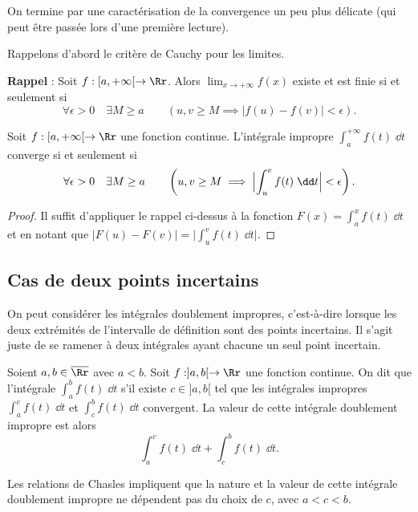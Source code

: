 \documentclass[class=report,crop=false]{standalone}
\begin{document}
On termine par une caractérisation de la convergence un peu plus délicate
(qui peut être passée lors d'une première lecture).


Rappelons d'abord le critère de Cauchy pour les limites.

\textbf{Rappel} : 
Soit $f : [a,+\infty[ \to \Rr$. 
Alors $\lim_{x\to +\infty} f(x)$ existe et est finie  si et seulement si 
$$\forall \epsilon>0\quad\exists M \ge a \qquad 
\left( u,v \ge M \implies \big|f(u)-f(v)\big|<\epsilon\right).$$

 
\begin{theoreme}
\label{th:intimpcauchy}
Soit $f : [a,+\infty[ \to \Rr$ une fonction continue.
L'intégrale impropre $\int_a^{+\infty} f(t) \; \dd t$ converge
si et seulement si
$$\forall \epsilon>0  \quad \exists  M \ge a \qquad
\left( u,v \ge M \implies \Bigl|\int_u^v f(t) \;\dd t\Bigr|<\epsilon\right).$$
\end{theoreme}

\begin{proof}
Il suffit d'appliquer le rappel ci-dessus à la fonction $F(x)=\int_a^x f(t) \; \dd t$ 
et en notant que $\big|F(u)-F(v)\big|=\big|\int_u^vf(t)\; \dd t\big|$.
\end{proof}

\subsection{Cas de deux points incertains}

On peut considérer les intégrales doublement impropres, c'est-à-dire lorsque les 
deux extrémités de l'intervalle de définition sont des points incertains. Il s'agit juste de se ramener à deux 
intégrales ayant chacune un seul point incertain.

\begin{definition}
Soient $a,b\in \overline{\Rr}$ avec $a<b$. 
Soit $f : ]a,b[ \to \Rr$ une fonction continue.
On dit que l'intégrale $\int_a^b f(t)\;\dd t$  s'il existe
$c \in ]a,b[$ tel que les  intégrales
impropres $\int_a^c f(t)\;\dd t$ et $\int_c^b f(t)\;\dd t$ convergent.
La valeur de cette intégrale doublement impropre est alors
$$\int_a^c f(t)\;\dd t+\int_c^b f(t)\;\dd t.$$
\end{definition}

Les relations de Chasles impliquent que la nature et la valeur de cette intégrale
doublement impropre ne dépendent pas du choix de $c$, avec $a<c<b$.
\end{document}
